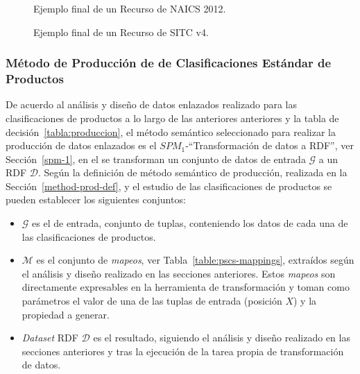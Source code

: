 \begin{figure}[!htp]

	\caption{Ejemplo final de un Recurso de NAICS 2012.}
	\label{fig:pscs-example-naics-2012}
\end{figure}


\begin{figure}[!htp]

	\caption{Ejemplo final de un Recurso de SITC v4.}
	\label{fig:pscs-example-sitc-v4}
\end{figure}


\clearpage
\subsubsection{Método de Producción de \linkeddata de Clasificaciones Estándar de Productos}
De acuerdo al análisis y diseño de datos enlazados realizado para las clasificaciones de productos 
a lo largo de las anteriores anteriores y la tabla de decisión~\ref{tabla:produccion}, el método semántico seleccionado 
para realizar la producción de datos enlazados es el $SPM_1$-``Transformación de datos a RDF'', ver Sección~\ref{spm-1}, en el 
se transforman un conjunto de datos de entrada $\mathcal{G}$ a un \dataset \gls{RDF} $\mathcal{D}$. Según la definición de método 
semántico de producción, realizada en la Sección~\ref{method-prod-def}, y el estudio de las clasificaciones de productos se pueden 
establecer los siguientes conjuntos:
\begin{itemize}
 \item $\mathcal{G}$ es el \dataset de entrada, conjunto de tuplas, conteniendo los datos de cada una de las clasificaciones de productos.
 \item $\mathcal{M}$ es el conjunto de \textit{mapeos}, ver Tabla~\ref{table:pscs-mappings}, extraídos según el análisis y diseño realizado en las secciones anteriores. Estos 
\textit{mapeos} son directamente expresables en la herramienta de transformación y toman como parámetros el valor de una de las tuplas de entrada (posición $X$) y la propiedad a generar.
 \item \textit{Dataset} RDF $\mathcal{D}$ es el \dataset resultado, siguiendo el análisis y diseño realizado en las secciones anteriores y tras la ejecución 
de la tarea propia de transformación de datos.
\end{itemize}

